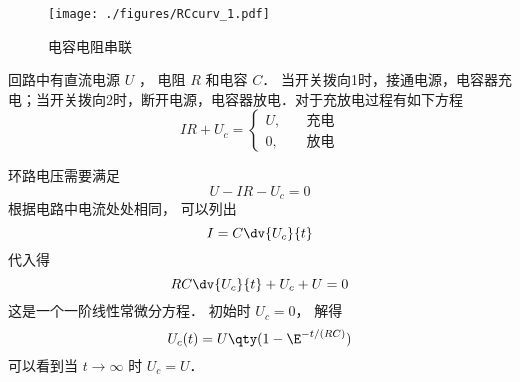 
\begin{issues}
\issueDraft
\end{issues}

\begin{figure}[ht]
\centering
\texttt{[image: ./figures/RCcurv\_1.pdf]}
\caption{电容电阻串联} \label{RCcurv_fig1}
\end{figure}
回路中有直流电源 $U$ ， 电阻 $R$ 和电容 $C$． 当开关拨向1时，接通电源，电容器充电；当开关拨向2时，断开电源，电容器放电．对于充放电过程有如下方程
\begin{equation}
IR+U_c=
\begin{cases}
U,& \quad\text{充电}\\
0,& \quad\text{放电}
\end{cases}
\end{equation}

环路电压需要满足
\begin{equation}
U - IR - U_c = 0
\end{equation}
根据电路中电流处处相同， 可以列出
\begin{equation}
I = C\dv{U_c}{t}
\end{equation}
代入得
\begin{equation}
RC\dv{U_c}{t} + U_c + U = 0
\end{equation}
这是一个一阶线性常微分方程． 初始时 $U_c = 0$， 解得
\begin{equation}
U_c(t) = U\qty(1 - \E^{-t/(RC)})
\end{equation}
可以看到当 $t \to \infty$ 时 $U_c = U$．


